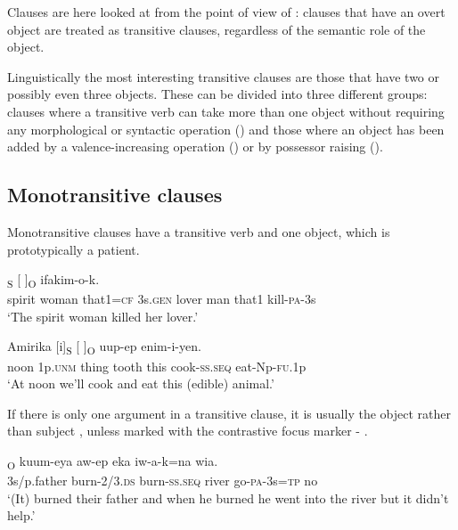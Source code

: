 Clauses are here looked at from the point of view of : clauses that have an overt object are treated as transitive clauses, regardless of the semantic role of the object. 

Linguistically the most interesting transitive clauses are those that have two or possibly even three objects. These can be divided into three different groups: clauses where a transitive verb can take more than one object without requiring any morphological or syntactic operation () and those where an object has been added by a valence-increasing operation () or by possessor raising ().

\subsection{Monotransitive clauses}

Monotransitive clauses have a transitive verb and one object, which is prototypically a patient. 

\ea%
\label{ex:5:x937}
\gll [Sawur  emeria  nain=ke]\textsubscript{S}  [   ]\textsubscript{O}  ifakim-o-k. \\
     spirit  woman  that1=\textsc{cf}  3s.\textsc{gen}  lover  man  that1  kill-\textsc{pa}-3s \\
\glt `The spirit woman killed her lover.'
\z

\ea%
\label{ex:5:x939}
\gll Amirika  [i]\textsubscript{S}  [  ]\textsubscript{O}  uup-ep enim-i-yen. \\
     noon  1p.\textsc{unm}  thing  tooth  this  cook-\textsc{ss}.\textsc{seq} eat-Np-\textsc{fu}.1p \\
\glt `At noon we'll cook and eat this (edible) animal.'
\z

If there is only one  argument in a transitive clause, it is usually the object rather than subject , unless marked with the contrastive focus marker - .

\ea%
\label{ex:5:x941}
\textsubscript{O}  kuum-eya  aw-ep  eka  iw-a-k=na  wia. \\
     3s/p.father  burn-2/3.\textsc{ds}  burn-\textsc{ss}.\textsc{seq}  river  go-\textsc{pa}-3s=\textsc{tp}  no \\
\glt `(It) burned their father and when he burned he went into the river but it didn't help.'
\z

